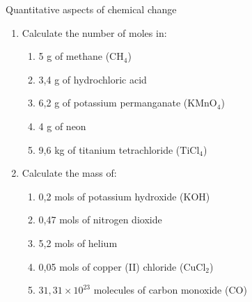 \begin{eocexercises}{Quantitative aspects of chemical change}
\begin{enumerate}[noitemsep, label=\textbf{\arabic*}. ]
\begin{enumerate}[noitemsep, label=\textbf{\alph*}. ]
\begin{enumerate}[noitemsep, label=\textbf{\alph*}. ]
\end{enumerate}
                \label{m38712*uid137}\item In the compound potassium sulphate ($\mathrm{K}{}_{2}\mathrm{SO}{}_{4}$), oxygen makes up x\% of the mass of the compound. x = ...
\label{m38712*id286432}\begin{enumerate}[noitemsep, label=\textbf{\alph*}. ] 
            \label{m38712*uid138}\item 36.8
\label{m38712*uid139}\item 9,2
\label{m38712*uid140}\item 4
\label{m38712*uid141}\item 18,3
\end{enumerate}
                \label{m38712*uid142}\item The molarity of a $150\phantom{\rule{2pt}{0ex}}{\mathrm{cm}}^{3}$ solution, containing 5 g of $\mathrm{NaCl}$ is...
\label{m38712*id286512}\begin{enumerate}[noitemsep, label=\textbf{\alph*}. ] 
            \label{m38712*uid143}\item $0,09\phantom{\rule{2pt}{0ex}}\mathrm{M}$
\label{m38712*uid144}\item $5,7\phantom{\rule{2pt}{0ex}}\ensuremath{\times}10{}^{-4}\phantom{\rule{2pt}{0ex}}\mathrm{M}$
\label{m38712*uid145}\item $0,57\phantom{\rule{2pt}{0ex}}\mathrm{M}$
\label{m38712*uid146}\item $0,03\phantom{\rule{2pt}{0ex}}\mathrm{M}$
\end{enumerate}
                \end{enumerate}
        \item Calculate the number of moles in:
\label{m38712*id6342}\begin{enumerate}[noitemsep, label=\textbf{\alph*}. ] 
            \item 5 g of methane (${\mathrm{CH}}_{4}$)\item 3,4 g of hydrochloric acid\item 6,2 g of potassium permanganate (${\mathrm{KMnO}}_{4}$)\item 4 g of neon\item 9,6 kg of titanium tetrachloride (${\mathrm{TiCl}}_{4}$)\end{enumerate}
        \item Calculate the mass of:\label{m38712*id7342}\begin{enumerate}[noitemsep, label=\textbf{\alph*}. ] 
            \item 0,2 mols of potassium hydroxide ($\mathrm{KOH}$)\item 0,47 mols of nitrogen dioxide\item 5,2 mols of helium\item 0,05 mols of copper (II) chloride (${\mathrm{CuCl}}_{2}$)\item $31,31\ensuremath{\times}{10}^{23}$ molecules of carbon monoxide ($\mathrm{CO}$)\end{enumerate}

\end{enumerate}
\end{eocexercises}
